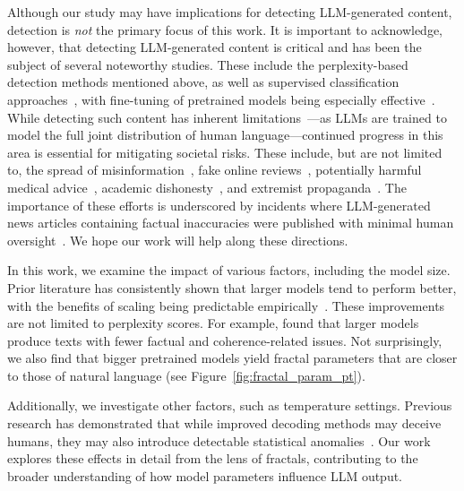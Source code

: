 Although our study may have implications for detecting LLM-generated content, detection is \emph{not} the primary focus of this work. It is important to acknowledge, however, that detecting LLM-generated content is critical and has been the subject of several noteworthy studies. These include the perplexity-based detection methods mentioned above, as well as supervised classification approaches~\citep{verma-etal-2024-ghostbuster,pu2022deepfaketextdetectionlimitations,jawahar-etal-2020-automatic,ghosal2023possibilitiesimpossibilitiesaigenerated,10.1145/3624725,dhaini-etal-2023-detecting,guo2023closechatgpthumanexperts}, with fine-tuning of pretrained models being especially effective~\citep{zellers2020defendingneuralfakenews,solaiman2019releasestrategiessocialimpacts,fagni2021tweepfake}. While detecting such content has inherent limitations~\citep{varshney2020limitsdetectingtextgenerated,sadasivan2024aigeneratedtextreliablydetected}---as LLMs are trained to model the full joint distribution of human language---continued progress in this area is essential for mitigating societal risks. These include, but are not limited to, the spread of misinformation~\citep{zellers2020defendingneuralfakenews}, fake online reviews~\citep{10.1145/3133956.3133990}, potentially harmful medical advice~\citep{guo2023closechatgpthumanexperts}, academic dishonesty~\citep{susnjak2022chatgptendonlineexam}, and extremist propaganda~\citep{mcguffie2020radicalizationrisksgpt3advanced}. The importance of these efforts is underscored by incidents where LLM-generated news articles containing factual inaccuracies were published with minimal human oversight~\citep{christian2023cnet}. We hope our work will help along these directions. 

In this work, we examine the impact of various factors, including the model size. Prior literature has consistently shown that larger models tend to perform better, with the benefits of scaling being predictable empirically~\citep{hestness2017deep,kaplan2020scaling,alabdulmohsin2022revisiting,zhai2106scaling}. These improvements are not limited to perplexity scores. For example, \cite{dou-etal-2022-gpt} found that larger models produce texts with fewer factual and coherence-related issues. Not surprisingly, we also find that bigger pretrained models yield fractal parameters that are closer to those of natural language (see Figure~\ref{fig:fractal_param_pt}). 

Additionally, we investigate other factors, such as temperature settings. Previous research has demonstrated that while improved decoding methods may deceive humans, they may also introduce detectable statistical anomalies~\citep{ippolito-etal-2020-automatic}. Our work explores these effects in detail from the lens of fractals, contributing to the broader understanding of how model parameters influence LLM output.

